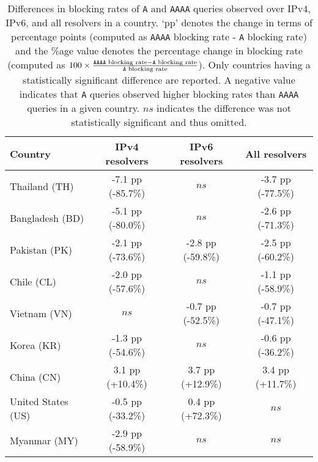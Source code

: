 \begin{table}[t]
  \centering
  \small
  \scalebox{\tabularscale} {
  \begin{tabular}{lccc}%
    \toprule
    {\bf Country}&{\bf IPv4 resolvers}&{\bf IPv6 resolvers} & {\bf All resolvers}
    \\ \midrule
    Thailand (TH)      & -7.1 pp (-85.7\%) & $ns$               & -3.7 pp (-77.5\%) \\
    Bangladesh (BD)    & -5.1 pp (-80.0\%) & $ns$               & -2.6 pp (-71.3\%) \\
    Pakistan (PK)      & -2.1 pp (-73.6\%) & -2.8 pp (-59.8\%)  & -2.5 pp (-60.2\%) \\
    Chile (CL)         & -2.0 pp (-57.6\%) & $ns$               & -1.1 pp (-58.9\%) \\
    Vietnam (VN)       & $ns$              & -0.7 pp (-52.5\%)  & -0.7 pp (-47.1\%) \\
    Korea (KR)         & -1.3 pp (-54.6\%) & $ns$               & -0.6 pp (-36.2\%) \\
    China (CN)         &  3.1 pp (+10.4\%) &  3.7 pp (+12.9\%)  &  3.4 pp (+11.7\%) \\
    \midrule
    United States (US) & -0.5 pp (-33.2\%) &  0.4 pp (+72.3\%)  &  $ns$  \\
    Myanmar (MY)       & -2.9 pp (-58.9\%) & $ns$    &  $ns$  \\
    \bottomrule
  \end{tabular}
  }
  \caption{Differences in blocking rates of {\tt A} and {\tt AAAA} queries
  observed over IPv4, IPv6, and all resolvers in a country. `pp' denotes the
  change in terms of percentage points (computed as {\tt AAAA} blocking rate
  - {\tt A} blocking rate) and the \%age value denotes the percentage change in
  blocking rate (computed as
  $
  100\times\frac{\text{{\tt AAAA} blocking rate} - \text{{\tt A} blocking rate}}
  {\text{{\tt A} blocking rate}}
  $). 
  Only countries having a statistically significant difference are reported. A
  negative value indicates that {\tt A} queries observed higher blocking rates
  than {\tt AAAA} queries in a given country. $ns$ indicates the difference was
  not statistically significant and thus omitted.}
  \label{tab:resources:countries}
\end{table}

